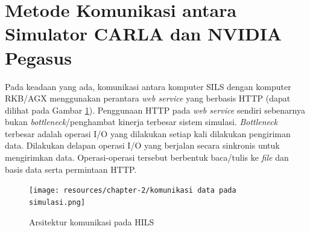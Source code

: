 
\section{Metode Komunikasi antara Simulator CARLA dan NVIDIA
  Pegasus}\label{chapter-2-section-comms}

Pada keadaan yang ada, komunikasi antara komputer SILS dengan komputer RKB/AGX
menggunakan perantara \textit{web service} yang berbasis HTTP (dapat dilihat
pada Gambar \ref{chapter-2-old-hils}). Penggunaan HTTP pada \textit{web service}
sendiri sebenarnya bukan \textit{bottleneck}/penghambat kinerja terbesar sistem
simulasi. \textit{Bottleneck} terbesar adalah operasi I/O yang dilakukan setiap
kali dilakukan pengiriman data. Dilakukan delapan operasi I/O yang berjalan
secara sinkronis untuk mengirimkan data. Operasi-operasi tersebut berbentuk
baca/tulis ke \textit{file} dan basis data serta permintaan HTTP.

\begin{figure}[!htbp]
	\centering
	\texttt{[image: resources/chapter-2/komunikasi
		data pada simulasi.png]}
	\caption{Arsitektur komunikasi pada HILS \parencite{trilaksono_laporanRispro}}
	\label{chapter-2-old-hils}
\end{figure}


